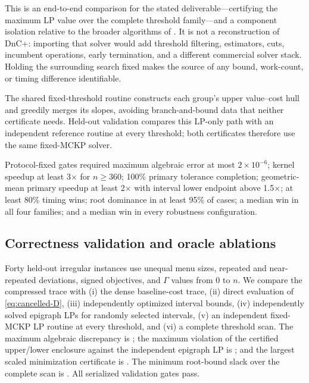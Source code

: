 \documentclass[11pt]{article}
\theoremstyle{plain}
\theoremstyle{definition}
\theoremstyle{remark}
\begin{document}
This is an end-to-end comparison for the stated deliverable---certifying the maximum LP value over the complete threshold family---and a component isolation relative to the broader algorithms of \citet{BusingGersingKoster2023}.  It is not a reconstruction of DnC+: importing that solver would add threshold filtering, estimators, cuts, incumbent operations, early termination, and a different commercial solver stack.  Holding the surrounding search fixed makes the source of any bound, work-count, or timing difference identifiable.

The shared fixed-threshold routine constructs each group's upper value--cost hull and greedily merges its slopes, avoiding branch-and-bound data that neither certificate needs.  Held-out validation compares this LP-only path with an independent reference routine at every threshold; both certificates therefore use the same fixed-MCKP solver.

Protocol-fixed gates required maximum algebraic error at most $2\times10^{-6}$; kernel speedup at least 3$\times$ for $n\ge360$; 100\% primary tolerance completion; geometric-mean primary speedup at least 2$\times$ with interval lower endpoint above 1.5$\times$; at least 80\% timing wins; root dominance in at least 95\% of cases; a median win in all four families; and a median win in every robustness configuration.

\subsection{Correctness validation and oracle ablations}

Forty held-out irregular instances use unequal menu sizes, repeated and near-repeated deviations, signed objectives, and $\Gamma$ values from 0 to $n$.  We compare the compressed trace with (i) the dense baseline-cost trace, (ii) direct evaluation of \eqref{eq:cancelled-D}, (iii) independently optimized interval bounds, (iv) independently solved epigraph LPs for randomly selected intervals, (v) an independent fixed-MCKP LP routine at every threshold, and (vi) a complete threshold scan.  The maximum algebraic discrepancy is \PubValidationMaxError; the maximum violation of the certified upper/lower enclosure against the independent epigraph LP is \PubValidationCertViolation; and the largest scaled minimization certificate is \PubValidationCertGap.  The minimum root-bound slack over the complete scan is \PubValidationMinSlack.  All serialized validation gates pass.
\end{document}
